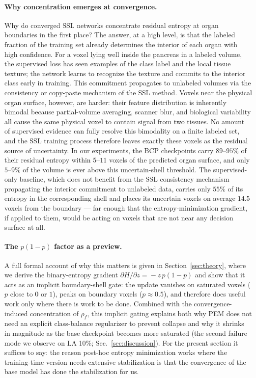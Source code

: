 \paragraph{Why concentration emerges at convergence.}
Why do converged SSL networks concentrate residual entropy at organ boundaries in the first place? The answer, at a high level, is that the labeled fraction of the training set already determines the interior of each organ with high confidence. For a voxel lying well inside the pancreas in a labeled volume, the supervised loss has seen examples of the class label and the local tissue texture; the network learns to recognize the texture and commits to the interior class early in training. This commitment propagates to unlabeled volumes via the consistency or copy-paste mechanism of the SSL method. Voxels near the physical organ surface, however, are harder: their feature distribution is inherently bimodal because partial-volume averaging, scanner blur, and biological variability all cause the same physical voxel to contain signal from two tissues. No amount of supervised evidence can fully resolve this bimodality on a finite labeled set, and the SSL training process therefore leaves exactly these voxels as the residual source of uncertainty. In our experiments, the BCP checkpoints carry $89$--$95\%$ of their residual entropy within $5$--$11$ voxels of the predicted organ surface, and only $5$--$9\%$ of the volume is ever above this uncertain-shell threshold. The supervised-only baseline, which does not benefit from the SSL consistency mechanism propagating the interior commitment to unlabeled data, carries only $55\%$ of its entropy in the corresponding shell and places its uncertain voxels on average $14.5$ voxels from the boundary --- far enough that the entropy-minimization gradient, if applied to them, would be acting on voxels that are not near any decision surface at all.

\paragraph{The $p(1{-}p)$ factor as a preview.}
A full formal account of why this matters is given in Section~\ref{sec:theory}, where we derive the binary-entropy gradient $\partial H/\partial z\!=\!-z\,p(1{-}p)$ and show that it acts as an implicit boundary-shell gate: the update vanishes on saturated voxels ($p$ close to $0$ or $1$), peaks on boundary voxels ($p\!\approx\!0.5$), and therefore does useful work only where there is work to be done. Combined with the convergence-induced concentration of $\rho_f$, this implicit gating explains both why PEM does not need an explicit class-balance regularizer to prevent collapse and why it shrinks in magnitude as the base checkpoint becomes more saturated (the second failure mode we observe on LA 10\%; Sec.~\ref{sec:discussion}). For the present section it suffices to say: the reason post-hoc entropy minimization works where the training-time version needs extensive stabilization is that the convergence of the base model has done the stabilization for us.

